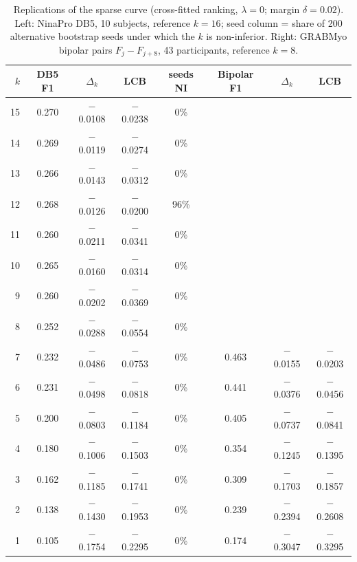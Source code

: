 \begin{table}[t]
\centering
\small
\caption{Replications of the sparse curve (cross-fitted ranking, $\lambda = 0$; margin $\delta = 0.02$). Left: NinaPro DB5, 10 subjects, reference $k = 16$; seed column = share of 200 alternative bootstrap seeds under which the $k$ is non-inferior. Right: GRABMyo bipolar pairs $F_j - F_{j+8}$, 43 participants, reference $k = 8$.}
\label{tab:replication}
\begin{tabular}{rccccccc}
\toprule
$k$ & DB5 F1 & $\Delta_k$ & LCB & seeds NI & Bipolar F1 & $\Delta_k$ & LCB \\
\midrule
15 & 0.270 & $-$0.0108 & $-$0.0238 & 0\% &  &  &  \\
14 & 0.269 & $-$0.0119 & $-$0.0274 & 0\% &  &  &  \\
13 & 0.266 & $-$0.0143 & $-$0.0312 & 0\% &  &  &  \\
12 & 0.268 & $-$0.0126 & $-$0.0200 & 96\% &  &  &  \\
11 & 0.260 & $-$0.0211 & $-$0.0341 & 0\% &  &  &  \\
10 & 0.265 & $-$0.0160 & $-$0.0314 & 0\% &  &  &  \\
9 & 0.260 & $-$0.0202 & $-$0.0369 & 0\% &  &  &  \\
8 & 0.252 & $-$0.0288 & $-$0.0554 & 0\% &  &  &  \\
7 & 0.232 & $-$0.0486 & $-$0.0753 & 0\% & 0.463 & $-$0.0155 & $-$0.0203 \\
6 & 0.231 & $-$0.0498 & $-$0.0818 & 0\% & 0.441 & $-$0.0376 & $-$0.0456 \\
5 & 0.200 & $-$0.0803 & $-$0.1184 & 0\% & 0.405 & $-$0.0737 & $-$0.0841 \\
4 & 0.180 & $-$0.1006 & $-$0.1503 & 0\% & 0.354 & $-$0.1245 & $-$0.1395 \\
3 & 0.162 & $-$0.1185 & $-$0.1741 & 0\% & 0.309 & $-$0.1703 & $-$0.1857 \\
2 & 0.138 & $-$0.1430 & $-$0.1953 & 0\% & 0.239 & $-$0.2394 & $-$0.2608 \\
1 & 0.105 & $-$0.1754 & $-$0.2295 & 0\% & 0.174 & $-$0.3047 & $-$0.3295 \\
\bottomrule
\end{tabular}
\end{table}
